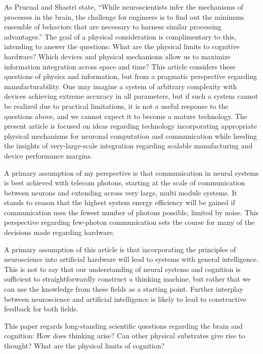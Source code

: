 \vspace{3em}
As Prucnal and Shastri state, ``While neuroscientists infer the mechanisms of processes in the brain, the challenge for engineers is to find out the minimum ensemble of behaviors that are necessary to harness similar processing advantages.'' The goal of a physical consideration is complimentary to this, intending to answer the questions: What are the physical limits to cognitive hardware? Which devices and physical mechanisms allow us to maximize information integration across space and time? This article considers these questions of physics and information, but from a pragmatic perspective regarding manufacturability. One may imagine a system of arbitrary complexity with devices achieving extreme accuracy in all parameters, but if such a system cannot be realized due to practical limitations, it is not a useful response to the questions above, and we cannot expect it to become a mature technology. The present article is focused on ideas regarding technology incorporating appropriate physical mechanisms for neuronal computation and communication while heeding the insights of very-large-scale integration regarding scalable manufacturing and device performance margins. 

\vspace{3em}
A primary assumption of my perspective is that communication in neural systems is best achieved with telecom photons, starting at the scale of communication between neurons and extending across very large, multi module systems. It stands to reason that the highest system energy efficiency will be gained if communication uses the fewest number of photons possible, limited by noise. This perspective regarding few-photon communication sets the course for many of the decisions made regarding hardware.

\vspace{3em}
A primary assumption of this article is that incorporating the principles of neuroscience into artificial hardware will lead to systems with general intelligence. This is not to say that our understanding of neural systems and cognition is sufficient to straightforwardly construct a thinking machine, but rather that we can use the knowledge from these fields as a starting point. Further interplay between neuroscience and artificial intelligence is likely to lead to constructive feedback for both fields.

\vspace{3em}
This paper regards long-standing scientific questions regarding the brain and cognition: How does thinking arise? Can other physical substrates give rise to thought? What are the physical limits of cognition?

\vspace{3em}
\cite{sisc2017}